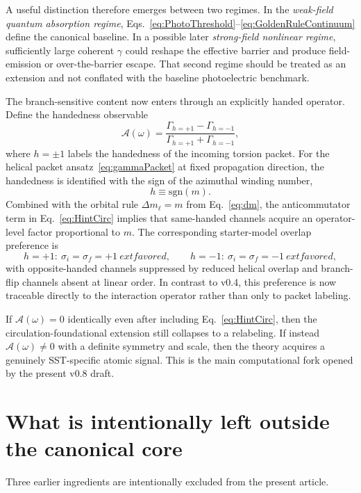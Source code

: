 \documentclass[11pt,a4paper]{article}
\begin{document}
A useful distinction therefore emerges between two regimes. In the \emph{weak-field quantum absorption regime}, Eqs.~\eqref{eq:PhotoThreshold}--\eqref{eq:GoldenRuleContinuum} define the canonical baseline. In a possible later \emph{strong-field nonlinear regime}, sufficiently large coherent $\gamma$ could reshape the effective barrier and produce field-emission or over-the-barrier escape. That second regime should be treated as an extension and not conflated with the baseline photoelectric benchmark.

The branch-sensitive content now enters through an explicitly handed operator. Define the handedness observable
\begin{equation}
\label{eq:Asymmetry}
\boxed{
\mathcal A(\omega)
=
\frac{\Gamma_{h=+1}-\Gamma_{h=-1}}{\Gamma_{h=+1}+\Gamma_{h=-1}},
}
\end{equation}
where $h=\pm 1$ labels the handedness of the incoming torsion packet. For the helical packet ansatz~\eqref{eq:gammaPacket} at fixed propagation direction, the handedness is identified with the sign of the azimuthal winding number,
\begin{equation}
\label{eq:h-sign-m}
\boxed{h\equiv \mathrm{sgn}(m).}
\end{equation}
Combined with the orbital rule $\Delta m_\ell=m$ from Eq.~\eqref{eq:dm}, the anticommutator term in Eq.~\eqref{eq:HintCirc} implies that same-handed channels acquire an operator-level factor proportional to $m$. The corresponding starter-model overlap preference is
\begin{equation}
\label{eq:handed-selection}
 h=+1:\ \sigma_i=\sigma_f=+1\ 	ext{favored},
 \qquad
 h=-1:\ \sigma_i=\sigma_f=-1\ 	ext{favored},
\end{equation}
with opposite-handed channels suppressed by reduced helical overlap and branch-flip channels absent at linear order. In contrast to v0.4, this preference is now traceable directly to the interaction operator rather than only to packet labeling.

If $\mathcal A(\omega)=0$ identically even after including Eq.~\eqref{eq:HintCirc}, then the circulation-foundational extension still collapses to a relabeling. If instead $\mathcal A(\omega)\neq 0$ with a definite symmetry and scale, then the theory acquires a genuinely SST-specific atomic signal. This is the main computational fork opened by the present v0.8 draft.

\section{What is intentionally left outside the canonical core}
Three earlier ingredients are intentionally excluded from the present article.
\end{document}
